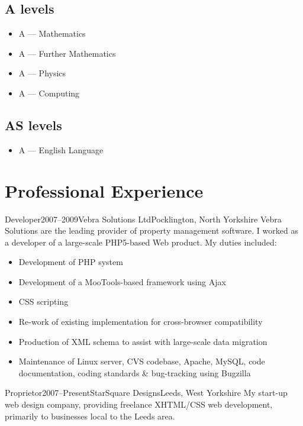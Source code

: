 \documentclass{cv}
\begin{document}
\subsection*{A levels}

\begin{itemize}
\item A --- Mathematics
\item A --- Further Mathematics
\item A --- Physics
\item A --- Computing
\end{itemize}

\subsection*{AS levels}

\begin{itemize}
\item A --- English Language
\end{itemize}

\section{Professional Experience}

\begin{experience}{Developer}{2007--2009}{Vebra Solutions Ltd}{Pocklington, North Yorkshire}
Vebra Solutions are the leading provider of property management software. I worked as a developer of a large-scale PHP5-based Web product. My duties included:

\begin{itemize}
\item Development of PHP system
\item Development of a MooTools-based framework using Ajax
\item CSS scripting
\item Re-work of existing implementation for cross-browser compatibility
\item Production of XML schema to assist with large-scale data migration
\item Maintenance of Linux server, CVS codebase, Apache, MySQL, code documentation, coding standards \& bug-tracking using Bugzilla
\end{itemize}
\end{experience}

\begin{experience}{Proprietor}{2007--Present}{StarSquare Designs}{Leeds, West Yorkshire}
My start-up web design company, providing freelance XHTML/CSS web development, primarily to businesses local to the Leeds area.
\end{experience}
\end{document}

